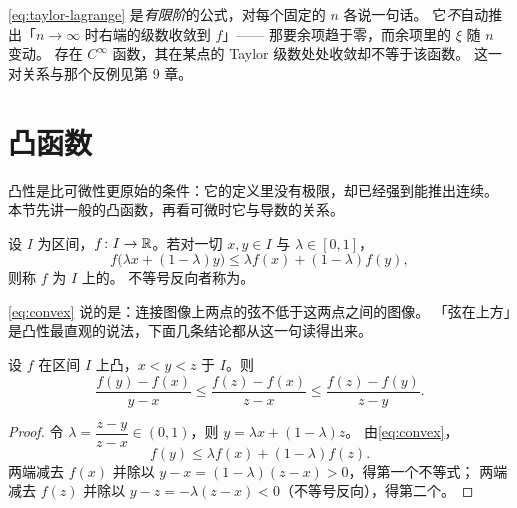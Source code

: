 \begin{pitfall}
  \cref{eq:taylor-lagrange} 是\emph{有限阶}的公式，对每个固定的 \(n\) 各说一句话。
  它\emph{不}自动推出「\(n \to \infty\) 时右端的级数收敛到 \(f\)」——
  那要余项趋于零，而余项里的 \(\xi\) 随 \(n\) 变动。
  存在 \(C^{\infty}\) 函数，其在某点的 Taylor 级数处处收敛却不等于该函数。
  这一对关系与那个反例见第 9 章。
\end{pitfall}

\section{凸函数}
\label{sec:convex}

凸性是比可微性更原始的条件：它的定义里没有极限，却已经强到能推出连续。
本节先讲一般的凸函数，再看可微时它与导数的关系。

\begin{definition}[凸函数]
  \label{def:convex}
  设 \(I\) 为区间，\(f \colon I \to \mathbb{R}\)。若对一切 \(x,y \in I\) 与 \(\lambda \in [0,1]\)，
  \begin{equation}
    \label{eq:convex}
    f\bigl(\lambda x + (1-\lambda)y\bigr) \le \lambda f(x) + (1-\lambda) f(y),
  \end{equation}
  则称 \(f\) 为 \(I\) 上的。
  不等号反向者称为。
\end{definition}

\begin{intuition}
  \cref{eq:convex} 说的是：连接图像上两点的弦不低于这两点之间的图像。
  「弦在上方」是凸性最直观的说法，下面几条结论都从这一句读得出来。
\end{intuition}

\begin{lemma}[三弦引理]
  \label{lem:three-chords}
  设 \(f\) 在区间 \(I\) 上凸，\(x<y<z\) 于 \(I\)。则
  \begin{equation}
    \label{eq:three-chords}
    \frac{f(y)-f(x)}{y-x} \le \frac{f(z)-f(x)}{z-x} \le \frac{f(z)-f(y)}{z-y} .
  \end{equation}
\end{lemma}

\begin{proof}
  令 \(\lambda = \dfrac{z-y}{z-x} \in (0,1)\)，则 \(y = \lambda x + (1-\lambda)z\)。
  由\cref{eq:convex}，
  \[
    f(y) \le \lambda f(x) + (1-\lambda) f(z) .
  \]
  两端减去 \(f(x)\) 并除以 \(y-x = (1-\lambda)(z-x) > 0\)，得第一个不等式；
  两端减去 \(f(z)\) 并除以 \(y-z = -\lambda(z-x) < 0\)（不等号反向），得第二个。
\end{proof}

